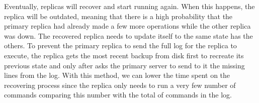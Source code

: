 \medskip

Eventually, replicas will recover and start running again. When this happens, the replica
will be outdated, meaning that there is a high probability that the primary replica had
already made a few more operations while the other replica was down. The recovered
replica needs to update itself to the same state has the others. To prevent the primary
replica to send the full log for the replica to execute, the replica gets the most recent
backup from disk first to recreate its previous state and only after asks the primary
server to send to it the missing lines from the log. With this method, we can lower the
time spent on the recovering process since the replica only needs to run a very few
number of commands comparing this number with the total of commands in the log.
